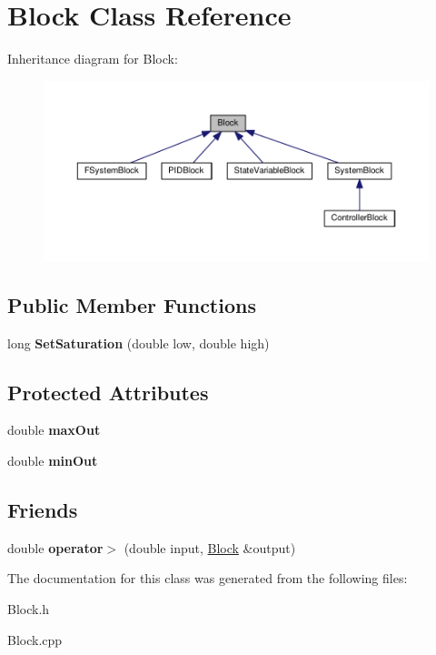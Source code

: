 \hypertarget{classBlock}{}\section{Block Class Reference}
\label{classBlock}


Inheritance diagram for Block\+:
\nopagebreak
\begin{figure}[H]
\begin{center}
\leavevmode
\includegraphics[width=350pt]{classBlock__inherit__graph}
\end{center}
\end{figure}
\subsection*{Public Member Functions}
\begin{DoxyCompactItemize}
\item 
\mbox{\label{classBlock_a1a17b39aaed97e601a1b2d508f6034e3}} 
long {\bfseries Set\+Saturation} (double low, double high)
\end{DoxyCompactItemize}
\subsection*{Protected Attributes}
\begin{DoxyCompactItemize}
\item 
\mbox{\label{classBlock_a9a2c531eb53f86d1c39a819ea7f65935}} 
double {\bfseries max\+Out}
\item 
\mbox{\label{classBlock_aaad01d77bced26bca7611ae8257c73f7}} 
double {\bfseries min\+Out}
\end{DoxyCompactItemize}
\subsection*{Friends}
\begin{DoxyCompactItemize}
\item 
\mbox{\label{classBlock_aff6f40255ea5461398bb769f499016fe}} 
double {\bfseries operator$>$} (double input, \hyperlink{classBlock}{Block} \&output)
\end{DoxyCompactItemize}


The documentation for this class was generated from the following files\+:\begin{DoxyCompactItemize}
\item 
Block.\+h\item 
Block.\+cpp\end{DoxyCompactItemize}
